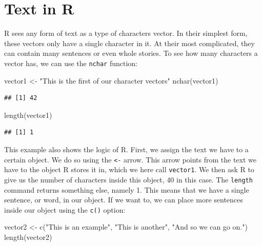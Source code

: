 \documentclass[
]{book}
\newenvironment{Shaded}{\begin{snugshade}}{\end{snugshade}}
\newcommand{\FunctionTok}[1]{\textcolor[rgb]{0.00,0.00,0.00}{#1}}
\newcommand{\NormalTok}[1]{#1}
\newcommand{\OtherTok}[1]{\textcolor[rgb]{0.56,0.35,0.01}{#1}}
\newcommand{\StringTok}[1]{\textcolor[rgb]{0.31,0.60,0.02}{#1}}
\begin{document}
\hypertarget{text-in-r}{%
\section{Text in R}\label{text-in-r}}

R sees any form of text as a type of characters vector. In their simplest form, these vectors only have a single character in it. At their most complicated, they can contain many sentences or even whole stories. To see how many characters a vector has, we can use the \texttt{nchar} function:

\begin{Shaded}
\begin{Highlighting}[]
\NormalTok{vector1 }\OtherTok{\textless{}{-}} \StringTok{"This is the first of our character vectors"}
\FunctionTok{nchar}\NormalTok{(vector1)}
\end{Highlighting}
\end{Shaded}

\begin{verbatim}
## [1] 42
\end{verbatim}

\begin{Shaded}
\begin{Highlighting}[]
\FunctionTok{length}\NormalTok{(vector1)}
\end{Highlighting}
\end{Shaded}

\begin{verbatim}
## [1] 1
\end{verbatim}

This example also shows the logic of R. First, we assign the text we have to a certain object. We do so using the \texttt{\textless{}-} arrow. This arrow points from the text we have to the object R stores it in, which we here call \texttt{vector1}. We then ask R to give us the number of characters inside this object, 40 in this case. The \texttt{length} command returns something else, namely 1. This means that we have a single sentence, or word, in our object. If we want to, we can place more sentences inside our object using the \texttt{c()} option:

\begin{Shaded}
\begin{Highlighting}[]
\NormalTok{vector2 }\OtherTok{\textless{}{-}} \FunctionTok{c}\NormalTok{(}\StringTok{"This is an example"}\NormalTok{, }\StringTok{"This is another"}\NormalTok{, }\StringTok{"And so we can go on."}\NormalTok{)}
\FunctionTok{length}\NormalTok{(vector2)}
\end{Highlighting}
\end{Shaded}
\end{document}
